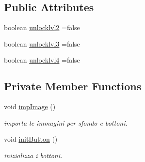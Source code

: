 \subsection*{Public Attributes}
\begin{DoxyCompactItemize}
\item 
boolean \hyperlink{classui_1_1_level_menu_a4546a97c9e98d01fc2547b2018856428}{unlocklvl2} =false
\item 
boolean \hyperlink{classui_1_1_level_menu_a670b1cc8dc37b763e9aa113b57e34420}{unlocklvl3} =false
\item 
boolean \hyperlink{classui_1_1_level_menu_af19dc9730ad4c9f05adee1ce65675728}{unlocklvl4} =false
\end{DoxyCompactItemize}
\subsection*{Private Member Functions}
\begin{DoxyCompactItemize}
\item 
void \hyperlink{classui_1_1_level_menu_aded9c531b53772fd90d09a8b6bf0132e}{imp\+Image} ()
\begin{DoxyCompactList}\small\item\em importa le immagini per sfondo e bottoni. \end{DoxyCompactList}\item 
void \hyperlink{classui_1_1_level_menu_aed9fe7e919d4355a7ad86701d44e1fea}{init\+Button} ()
\begin{DoxyCompactList}\small\item\em inizializza i bottoni. \end{DoxyCompactList}\end{DoxyCompactItemize}
